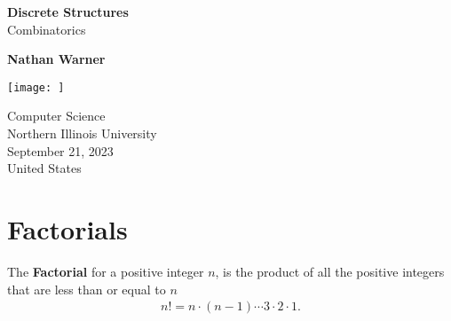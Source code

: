 \documentclass{report}
\title{\Huge{}}
\author{\huge{Nathan Warner}}
\date{\huge{}}
\begin{document}
        \begin{titlepage}
       \begin{center}
           \vspace*{1cm}
    
           \textbf{Discrete Structures} \\
           Combinatorics
    
           \vspace{0.5cm}
            
                
           \vspace{1.5cm}
    
           \textbf{Nathan Warner}
    
           \vfill
                
                
           \vspace{0.8cm}
         
           \texttt{[image: ]}
                
           Computer Science \\
           Northern Illinois University\\
           September 21, 2023 \\
           United States\\
           
                
       \end{center}
    \end{titlepage}
    \tableofcontents
    \pagebreak \bigbreak \noindent
    \section{\LARGE Factorials}
    \bigbreak \noindent 
    \smallbreak \noindent
    \begin{definition}
        The \textbf{Factorial} for a positive integer $n$, is the product of all the positive integers that are less than or equal to $n$ 
        \begin{align*}
            n! = n \cdot (n-1) \cdots 3 \cdot 2 \cdot 1
        .\end{align*}
    \end{definition}

    \pagebreak \bigbreak \noindent 
\end{document}
